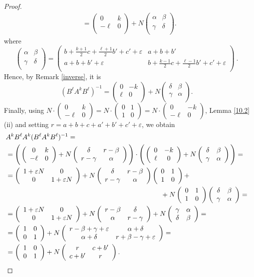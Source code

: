 \documentclass[10pt]{amsart}
\theoremstyle{plain}
\theoremstyle{definition}
\theoremstyle{remark}%
\newcommand{\mat}[4]{\left(\begin{array}{cc}
 #1 & #2\\
 #3 & #4\\
\end{array}\right)}
\begin{document}
\begin{proof}
\begin{align*}
 &=\mat{0}{k}{-\ell}{0}+
 N\mat{\alpha}{\beta}{\gamma}{\delta}.
 \end{align*}
 where 
 $$\mat{\alpha}{\beta}{\gamma}{\delta}=\mat{b+\frac{k+1}{2}c+\frac{\ell+1}{2}b'+c'+\varepsilon}{a+b+b'}{a+b+b'+\varepsilon}{b+\frac{k-1}{2}c+\frac{\ell-1}{2}b'+c'+\varepsilon}\ .$$
 Hence, by Remark \ref{inverse}, it is
 $$(B^{\ell}A^k B^{\ell})^{-1}=\mat{0}{-k}{\ell}{0}+
 N\mat{\delta}{\beta}{\gamma}{\alpha}.$$
 Finally, using $N\cdot(\begin{smallmatrix}0 & k\\ -\ell & 0\end{smallmatrix})=N\cdot(\begin{smallmatrix}0 & 1\\ 1 & 0\end{smallmatrix})=N\cdot(\begin{smallmatrix}0 & -k\\ -\ell & 0\end{smallmatrix})$, Lemma \ref{10.2}(ii) and setting $r=a+b+c+a'+b'+c'+\varepsilon$,  we obtain
 \begin{align*}
  &A^k B^{\ell}A^k(B^{\ell}A^k B^{\ell})^{-1}
 =\\
 &=\Bigg(\mat{0}{k}{-\ell}{0}+
 N\mat{\delta}{r-\beta}{r-\gamma}{\alpha}\Bigg)
 \cdot\Bigg(\mat{0}{-k}{\ell}{0}+
 N\mat{\delta}{\beta}{\gamma}{\alpha}\Bigg)=\\
 &=\mat{1+\varepsilon N}{0}{0}{1+\varepsilon N}
+N\mat{\delta}{r-\beta}{r-\gamma}{\alpha}\mat{0}{1}{1}{0}+\\
&\hspace{80mm}+N\mat{0}{1}{1}{0}\mat{\delta}{\beta}{\gamma}{\alpha}=\\
 &=\mat{1+\varepsilon N}{0}{0}{1+\varepsilon N}
 +N\mat{r-\beta}{\delta}{\alpha}{r-\gamma}
+N\mat{\gamma}{\alpha}{\delta}{\beta}=\\
&=\mat{1}{0}{0}{1}
 +N\mat{r-\beta+\gamma+\varepsilon}{\alpha+\delta}{\alpha+\delta}{r+\beta-\gamma+\varepsilon}=\\
 &=\mat{1}{0}{0}{1}+
 N\mat{r}{c+b'}{c+b'}{r}.
 \end{align*}
\end{proof}
\end{document}
